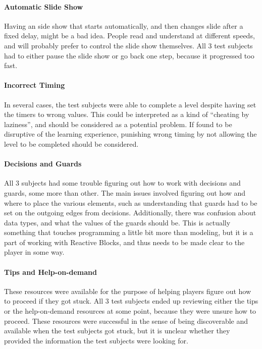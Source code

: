 \paragraph{Automatic Slide Show} Having an side show that starts automatically, and then changes slide after a fixed delay, might be a bad idea. People read and understand at different speeds, and will probably prefer to control the slide show themselves. All 3 test subjects had to either pause the slide show or go back one step, because it progressed too fast.

\paragraph{Incorrect Timing} In several cases, the test subjects were able to complete a level despite having set the timers to wrong values. This could be interpreted as a kind of ``cheating by laziness'', and should be considered as a potential problem. If found to be disruptive of the learning experience, punishing wrong timing by not allowing the level to be completed should be considered.

\paragraph{Decisions and Guards} All 3 subjects had some trouble figuring out how to work with decisions and guards, some more than other. The main issues involved figuring out how and where to place the various elements, such as understanding that guards had to be set on the outgoing edges from decisions. Additionally, there was confusion about data types, and what the values of the guards should be. This is actually something that touches programming a little bit more than modeling, but it is a part of working with Reactive Blocks, and thus needs to be made clear to the player in some way.

\paragraph{Tips and Help-on-demand} These resources were available for the purpose of helping players figure out how to proceed if they got stuck. All 3 test subjects ended up reviewing either the tips or the help-on-demand resources at some point, because they were unsure how to proceed. These resources were successful in the sense of being discoverable and available when the test subjects got stuck, but it is unclear whether they provided the information the test subjects were looking for.

